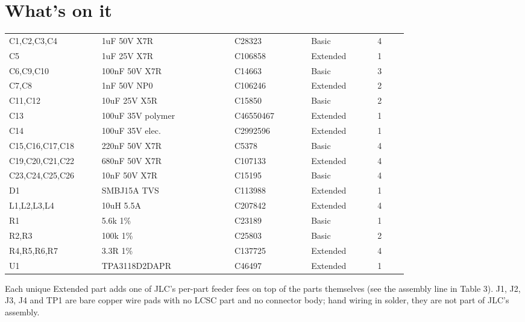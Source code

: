 \section{What's on it}

\begin{hsblock}
\par\vspace{8pt}
{\footnotesize
\begin{tabular}{L{0.17\linewidth} L{0.26\linewidth} L{0.15\linewidth} L{0.13\linewidth} L{0.06\linewidth}}
\hstoprule
{} &  &  &  &  \\
\hline
C1,C2,C3,C4 & 1uF 50V X7R & C28323 & Basic & 4 \\
C5 & 1uF 25V X7R & C106858 & Extended & 1 \\
C6,C9,C10 & 100nF 50V X7R & C14663 & Basic & 3 \\
C7,C8 & 1nF 50V NP0 & C106246 & Extended & 2 \\
C11,C12 & 10uF 25V X5R & C15850 & Basic & 2 \\
C13 & 100uF 35V polymer & C46550467 & Extended & 1 \\
C14 & 100uF 35V elec. & C2992596 & Extended & 1 \\
C15,C16,C17,C18 & 220nF 50V X7R & C5378 & Basic & 4 \\
C19,C20,C21,C22 & 680nF 50V X7R & C107133 & Extended & 4 \\
C23,C24,C25,C26 & 10nF 50V X7R & C15195 & Basic & 4 \\
D1 & SMBJ15A TVS & C113988 & Extended & 1 \\
L1,L2,L3,L4 & 10uH 5.5A & C207842 & Extended & 4 \\
R1 & 5.6k 1\% & C23189 & Basic & 1 \\
R2,R3 & 100k 1\% & C25803 & Basic & 2 \\
R4,R5,R6,R7 & 3.3R 1\% & C137725 & Extended & 4 \\
U1 & TPA3118D2DAPR & C46497 & Extended & 1 \\
\hline
\end{tabular}}
\end{hsblock}

Each unique Extended part adds one of JLC's per-part feeder fees on top of
the parts themselves (see the assembly line in Table 3). J1, J2, J3, J4 and
TP1 are bare copper wire pads with no LCSC part and no connector body; hand
wiring in solder, they are not part of JLC's assembly.

